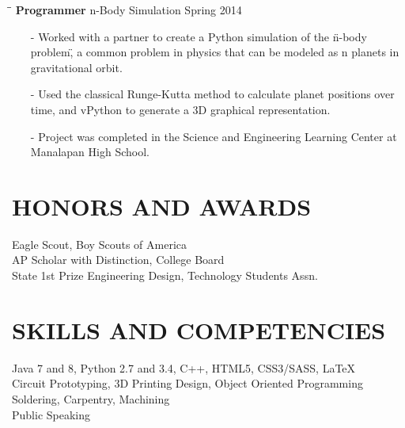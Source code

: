 \documentclass{res}
\begin{document}
\begin{resume}
\begin{tabbing}
    \hspace{2.3in}\= \hspace{2.4in}\= \kill
    {\bf Programmer} \>n-Body Simulation \>Spring 2014\\
  \end{tabbing}\vspace{-15pt}
  \begin{itemize}[leftmargin=*, nolistsep]
    \item[-] Worked with a partner to create a Python simulation of the \"n-body problem\", a common problem in physics that can be modeled as n planets in gravitational orbit.
    \item[-] Used the classical Runge-Kutta method to calculate planet positions over time, and vPython to generate a 3D graphical representation.
    \item[-] Project was completed in the Science and Engineering Learning Center at Manalapan High School.
  \end{itemize}
 
\section{HONORS AND AWARDS}
	Eagle Scout, Boy Scouts of America \\
	AP Scholar with Distinction, College Board \\
	State 1st Prize Engineering Design, Technology Students Assn.

\section{SKILLS AND COMPETENCIES}
  Java 7 and 8, Python 2.7 and 3.4, C++, HTML5, CSS3/SASS, \LaTeX \\
  Circuit Prototyping, 3D Printing Design, Object Oriented Programming \\
  Soldering, Carpentry, Machining \\
  Public Speaking
	
\end{resume}
\end{document}
